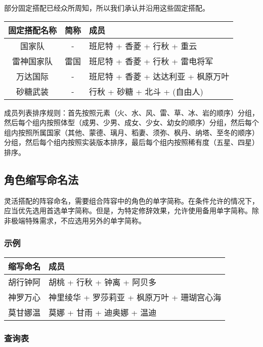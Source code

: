 部分固定搭配已经众所周知，所以我们承认并沿用这些固定搭配。

\noindent\begin{tabu}{|c|c|X[c]|}
	\hline
	{固定搭配名称} & {简称} & {成员}                                \\
	\hline
	{国家队}       & {-}    & {班尼特 + 香菱 + 行秋 + 重云}         \\
	{雷神国家队}   & {雷国} & {班尼特 + 香菱 + 行秋 + 雷电将军}     \\
	{万达国际}     & {-}    & {班尼特 + 香菱 + 达达利亚 + 枫原万叶} \\
	{砂糖武装}     & {-}    & {行秋 + 砂糖 + 北斗 + (自由人)}       \\
	\hline
\end{tabu}

成员列表排序规则：首先按照元素（火、水、风、雷、草、冰、岩的顺序）分组，然后每个组内按照体型（成男、少男、成女、少女、幼女的顺序）分组，然后每个组内按照所属国家（其他、蒙德、璃月、稻妻、须弥、枫丹、纳塔、至冬的顺序）分组，然后每个组内按照实装版本排序，最后每个组内按照稀有度（五星、四星）排序。


\subsection{角色缩写命名法}

灵活搭配的阵容命名，需要组合阵容中的角色的单字简称。在条件允许的情况下，应当优先选用首选单字简称。但是，为特定修辞效果，允许使用备用单字简称。除非极端特殊需求，不应选用另外的单字简称。

\subsubsection{示例}

\noindent\begin{tabu}{|c|X[c]|}
	\hline
	{缩写命名} & {成员}                                        \\
	\hline
	{胡行钟阿} & {胡桃 + 行秋 + 钟离 + 阿贝多}                 \\
	{神罗万心} & {神里绫华 + 罗莎莉亚 + 枫原万叶 + 珊瑚宫心海} \\
	{莫甘娜温} & {莫娜 + 甘雨 + 迪奥娜 + 温迪}                 \\
	\hline
\end{tabu}

\subsubsection{查询表}

